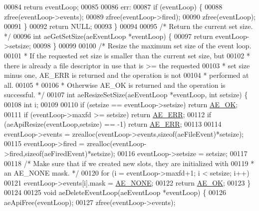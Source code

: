 \begin{DoxyCode}
00084     \textcolor{keywordflow}{return} eventLoop;
00085 
00086 err:
00087     \textcolor{keywordflow}{if} (eventLoop) \{
00088         zfree(eventLoop->events);
00089         zfree(eventLoop->fired);
00090         zfree(eventLoop);
00091     \}
00092     \textcolor{keywordflow}{return} NULL;
00093 \}
00094 
00095 \textcolor{comment}{/* Return the current set size. */}
00096 \textcolor{keywordtype}{int} aeGetSetSize(aeEventLoop *eventLoop) \{
00097     \textcolor{keywordflow}{return} eventLoop->setsize;
00098 \}
00099 
00100 \textcolor{comment}{/* Resize the maximum set size of the event loop.}
00101 \textcolor{comment}{ * If the requested set size is smaller than the current set size, but}
00102 \textcolor{comment}{ * there is already a file descriptor in use that is >= the requested}
00103 \textcolor{comment}{ * set size minus one, AE\_ERR is returned and the operation is not}
00104 \textcolor{comment}{ * performed at all.}
00105 \textcolor{comment}{ *}
00106 \textcolor{comment}{ * Otherwise AE\_OK is returned and the operation is successful. */}
00107 \textcolor{keywordtype}{int} aeResizeSetSize(aeEventLoop *eventLoop, \textcolor{keywordtype}{int} setsize) \{
00108     \textcolor{keywordtype}{int} i;
00109 
00110     \textcolor{keywordflow}{if} (setsize == eventLoop->setsize) \textcolor{keywordflow}{return} \hyperlink{ae_8h_afaac43d9573452f9fc6c718f90c4c645}{AE\_OK};
00111     \textcolor{keywordflow}{if} (eventLoop->maxfd >= setsize) \textcolor{keywordflow}{return} \hyperlink{ae_8h_aa16dcf7effdf8f8df97f51b1cb51a9df}{AE\_ERR};
00112     \textcolor{keywordflow}{if} (aeApiResize(eventLoop,setsize) == -1) \textcolor{keywordflow}{return} \hyperlink{ae_8h_aa16dcf7effdf8f8df97f51b1cb51a9df}{AE\_ERR};
00113 
00114     eventLoop->events = zrealloc(eventLoop->events,\textcolor{keyword}{sizeof}(aeFileEvent)*setsize);
00115     eventLoop->fired = zrealloc(eventLoop->fired,\textcolor{keyword}{sizeof}(aeFiredEvent)*setsize);
00116     eventLoop->setsize = setsize;
00117 
00118     \textcolor{comment}{/* Make sure that if we created new slots, they are initialized with}
00119 \textcolor{comment}{     * an AE\_NONE mask. */}
00120     \textcolor{keywordflow}{for} (i = eventLoop->maxfd+1; i < setsize; i++)
00121         eventLoop->events[i].mask = \hyperlink{ae_8h_aea2e33b645e48a3fbb26261005f6df41}{AE\_NONE};
00122     \textcolor{keywordflow}{return} \hyperlink{ae_8h_afaac43d9573452f9fc6c718f90c4c645}{AE\_OK};
00123 \}
00124 
00125 \textcolor{keywordtype}{void} aeDeleteEventLoop(aeEventLoop *eventLoop) \{
00126     aeApiFree(eventLoop);
00127     zfree(eventLoop->events);

\end{DoxyCode}
